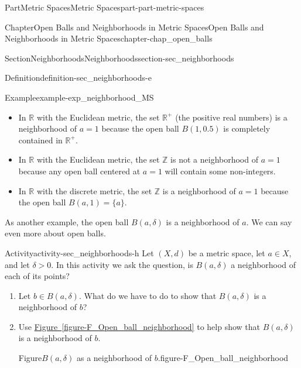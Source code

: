 \documentclass[oneside,10pt,]{book}
\newcommand{\xreffont}{\relax}
\numberwithin{equation}{chapter}
\newcommand{\Z}{\mathbb{Z}}
\newcommand{\R}{\mathbb{R}}
\newcommand{\gt}{>}
\begin{document}
\begin{partptx}{Part}{Metric Spaces}{}{Metric Spaces}{}{}{part-part-metric-spaces}
\begin{chapterptx}{Chapter}{Open Balls and Neighborhoods in Metric Spaces}{}{Open Balls and Neighborhoods in Metric Spaces}{}{}{chapter-chap_open_balls}
\begin{sectionptx}{Section}{Neighborhoods}{}{Neighborhoods}{}{}{section-sec_neighborhoods}
\begin{definition}{Definition}{}{definition-sec_neighborhoods-e}
\end{definition}
\begin{example}{Example}{}{example-exp_neighborhood_MS}%
%
\begin{itemize}[label=\textbullet]
\item{}In \(\R\) with the Euclidean metric, the set \(\R^+\) (the positive real numbers) is a neighborhood of \(a=1\) because the open ball \(B(1,0.5)\) is completely contained in \(\R^+\).%
\item{}In \(\R\) with the Euclidean metric, the set \(\Z\) is not a neighborhood of \(a=1\) because any open ball centered at \(a=1\) will contain some non-integers.%
\item{}In \(\R\) with the discrete metric, the set \(\Z\) is a neighborhood of \(a=1\) because the open ball \(B(a,1) = \{a\}\).%
\end{itemize}
%
\end{example}
As another example, the open ball \(B(a, \delta)\) is a neighborhood of \(a\). We can say even more about open balls.%
\begin{activity}{Activity}{}{activity-sec_neighborhoods-h}%
Let \((X, d)\) be a metric space, let \(a \in X\), and let \(\delta \gt 0\). In this activity we ask the question, is \(B(a, \delta)\) a neighborhood of each of its points?%
\begin{enumerate}[font=\bfseries,label=(\alph*),ref=\alph*]%
\item{}Let \(b \in B(a, \delta)\). What do we have to do to show that \(B(a, \delta)\) is a neighborhood of \(b\)?%
\item{}Use \hyperref[figure-F_Open_ball_neighborhood]{Figure~{\xreffont\ref{figure-F_Open_ball_neighborhood}}} to help show that \(B(a, \delta)\) is a neighborhood of \(b\).%
\begin{figureptx}{Figure}{\(B(a, \delta)\) as a neighborhood of \(b\).}{figure-F_Open_ball_neighborhood}{}%
\begin{image}{0.25}{0.5}{0.25}{}%

\end{image}
\end{figureptx}
\end{enumerate}
\end{activity}
\end{sectionptx}
\end{chapterptx}
\end{partptx}
\end{document}
